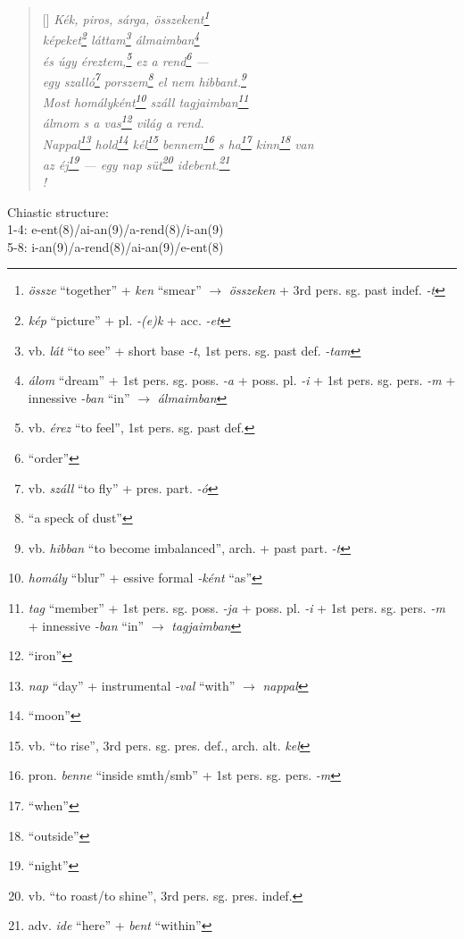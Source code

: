 \documentclass[a4paper,12pt,twoside,final]{book}
\begin{document}
\begin{verse}[\versewidth]
  \it
  Kék, piros, sárga, összekent\footnote{\emph{össze} ``together'' +
  \emph{ken} ``smear'' $\rightarrow$ \emph{összeken} + 3rd
  pers. sg. past indef. \emph{-t}} \\
  képeket\footnote{\emph{kép} ``picture'' + pl. \emph{-(e)k} +
  acc. \emph{-et}} láttam\footnote{vb. \emph{lát} ``to see'' +
  short base \emph{-t}, 1st pers. sg. past def. \emph{-tam}}
  álmaimban\footnote{\emph{álom} ``dream'' +
  1st pers. sg. poss. \emph{-a} + poss. pl. \emph{-i} + 1st
  pers. sg. pers. \emph{-m} + innessive \emph{-ban} ``in'' $\rightarrow$
  \emph{álmaimban}} \\
  és úgy éreztem,\footnote{vb. \emph{érez} ``to feel'', 1st
  pers. sg. past def.} ez a rend\footnote{``order''} --- \\
  egy szalló\footnote{vb. \emph{száll} ``to fly'' +
  pres. part. \emph{-ó}} porszem\footnote{``a speck of dust''} el nem
  hibbant.\footnote{vb. \emph{hibban}
  ``to become imbalanced'', arch. + past part. \emph{-t}} \\
  Most homályként\footnote{\emph{homály} ``blur'' +
  essive formal \emph{-ként} ``as''} száll tagjaimban\footnote{\emph{tag}
  ``member'' + 1st pers. sg. poss. \emph{-ja} +
  poss. pl. \emph{-i} + 1st pers. sg. pers. \emph{-m} +
  innessive \emph{-ban} ``in'' $\rightarrow$ \emph{tagjaimban}} \\
  álmom s a vas\footnote{``iron''} világ a rend. \\
  Nappal\footnote{\emph{nap} ``day'' + instrumental \emph{-val}
  ``with'' $\rightarrow$ \emph{nappal}} hold\footnote{``moon''}
  kél\footnote{vb. ``to rise'', 3rd pers. sg. pres. def.,
  arch. alt. \emph{kel}} bennem\footnote{pron. \emph{benne} ``inside
  smth/smb'' + 1st pers. sg. pers. \emph{-m}} s ha\footnote{``when''}
  kinn\footnote{``outside''} van  \\
  az éj\footnote{``night''} --- egy nap süt\footnote{vb. ``to
  roast/to shine'', 3rd pers. sg. pres. indef.}
  idebent.\footnote{adv. \emph{ide} ``here'' + \emph{bent} ``within''} \\!
\end{verse}

\noindent Chiastic structure: \\
1-4: e-ent(8)/ai-an(9)/a-rend(8)/i-an(9) \\
5-8: i-an(9)/a-rend(8)/ai-an(9)/e-ent(8)
\end{document}

